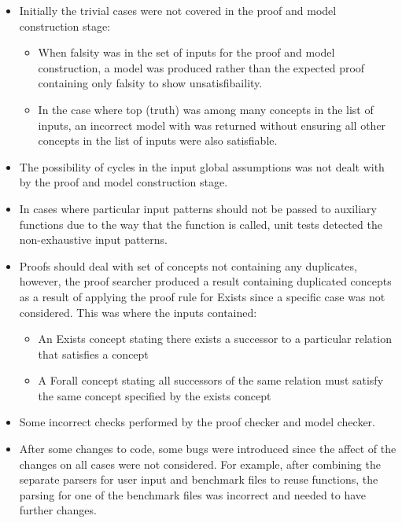 \begin{itemize}
\item Initially the trivial cases were not covered in the proof and model construction stage:
  \begin{itemize}
    \item When falsity was in the set of inputs for the proof and model construction, a model was produced rather than the expected proof containing only falsity to show unsatisfibaility.
    \item In the case where top (truth) was among many concepts in the list of inputs, an incorrect model with was returned without ensuring all other concepts in the list of inputs were also satisfiable.
  \end{itemize}
\item The possibility of cycles in the input global assumptions was not dealt with by the proof and model construction stage.

\item In cases where particular input patterns should not be passed to auxiliary functions due to the way that the function is called, unit tests detected the non-exhaustive input patterns.

\item Proofs should deal with set of concepts not containing any duplicates, however, the proof searcher produced a result containing duplicated concepts as a result of applying the proof rule for Exists since a specific case was not considered. This was where the inputs contained:
  \begin{itemize}
    \item An Exists concept stating there exists a successor to a particular relation that satisfies a concept
    \item A Forall concept stating all successors of the same relation must satisfy the same concept specified by the exists concept
  \end{itemize}
\item Some incorrect checks performed by the proof checker and model checker.

\item After some changes to code, some bugs were introduced since the affect of the changes on all cases were not considered. For example, after combining the separate parsers for user input and benchmark files to reuse functions, the parsing for one of the benchmark files was incorrect and needed to have further changes. 
\end{itemize}
